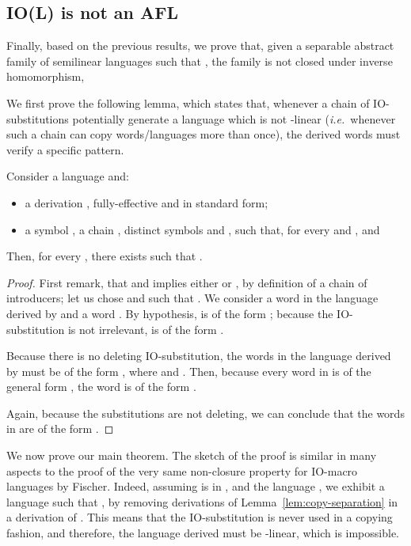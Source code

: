 \subsection{\textbf{IO(L)} is not an AFL}

Finally, based on the previous results, we prove that,  given  a separable abstract family of semilinear languages such that , the family  is not closed under inverse homomorphism,

We first prove the following lemma, which states that, whenever a chain of IO-substitutions potentially generate a language which is not -linear (\textit{i.e.}~whenever such a chain can  copy words/languages more than once), the derived words must verify a specific pattern.

\begin{lemma}\label{lem:copy-separation}
  Consider a language  and:
  \begin{itemize}
    \item a derivation , fully-effective and in standard form;
    \item a symbol , a chain , distinct symbols  and ,  such that, for every  and ,  and 
    \end{itemize}
    Then, for every , there exists  such that .
\end{lemma}
\begin{proof}
First remark, that  and  implies either  or , by definition of a chain of introducers; let us chose  and  such that .
We consider a word  in the language derived by  and a word .
By hypothesis,  is of the form ; because the IO-substitution is not irrelevant,  is of the form .

Because there is no deleting IO-substitution, the words in the language derived by  must be of the form , where  and .
Then, because every word in  is of the general form , the word  is of the form .

Again, because the substitutions are not deleting, we can conclude that the words in  are of the form .
\end{proof}

We now prove our main theorem. The sketch of the proof is similar in many aspects to the proof of the very same non-closure property for IO-macro languages by Fischer.
Indeed, assuming  is in , and the language , we exhibit a language  such that , by removing derivations of Lemma~\ref{lem:copy-separation} in a derivation of . This means that the IO-substitution is never used in a copying fashion, and therefore, the language derived must be -linear, which is impossible.

